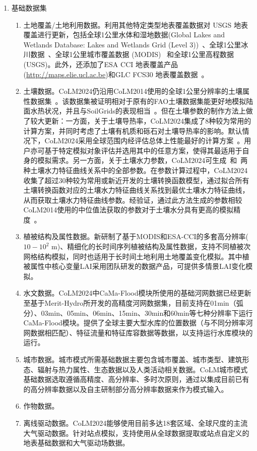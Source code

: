 \begin{enumerate}[label={\arabic*)}]
\item 基础数据集
  \begin{enumerate}[label={\alph*)}]
  \item 土地覆盖/土地利用数据。利用其他特定类型地表覆盖数据对 USGS 地表覆盖进行更新，包括全球1公里水体和湿地数据(Global Lakes and Wetlands Database: Lakes and Wetlands Grid (Level 3))~\citep{lehner2004development}、全球1公里冰川数据~\citep{RGIConsortium2017}、全球1公里城市覆盖数据 (MODIS)~\citep{schneider2009new} 和全球1公里高程数据(USGS)。此外，还添加了ESA CCI 地表覆盖产品(\url{http://maps.elie.ucl.ac.be})和GLC FCS30 地表覆盖数据~\citep{zhang2023glc_fcs30d}。
  \item 土壤数据。CoLM2024仍沿用CoLM2014使用的全球1公里分辨率的土壤属性数据集~\citep{shangguan2014global}。该数据集被证明相对于原有的FAO土壤数据集能更好地模拟陆面水热状况，并且与SoilGrids的表现相当~\citep{李文耀2020土壤}。但在土壤参数的制作方法上做了较大更新：一方面，关于土壤导热率，CoLM2024集成了8种较为常用的计算方案，并同时考虑了土壤有机质和砾石对土壤导热率的影响。默认情况下，CoLM2024采用全球范围内经评估总体上性能最好的计算方案~\citep{dai2019evaluation, balland2005}。用户亦可基于特定模拟对象评估并选用其中的任意方案，使得其最适用于自身的模拟需求。另一方面，关于土壤水力参数，CoLM2024可生成~\citet{campbell1974}和~\citet{van1980closed}两种土壤水力特征曲线关系中的全部参数。在参数计算过程中，CoLM2024收集了超过30种较为常用或新近开发的土壤转换函数模型，通过拟合所有土壤转换函数对应的土壤水力特征曲线关系找到最优土壤水力特征曲线，从而获取土壤水力特征曲线参数。经验证，通过此方法生成的参数相较CoLM2014使用的中位值法获取的参数对于土壤水分具有更高的模拟精度~\citep{dai2019parameters}。
  \item 植被结构及属性数据。新研制了基于MODIS和ESA-CCI的多套高分辨率($10-10^2$ m)、精细化的长时间序列植被结构及属性数据，支持不同植被次网格结构模拟，同时也适用于长时间土地利用土地覆盖变化模拟。其中植被属性中核心变量LAI采用团队研发的数据产品\citep{yuan2011reprocessing,lin2023ReprocessedMODISVersion}，可提供多情景LAI变化模拟。
  \item 水文数据。CoLM2024中CaMa-Flood模块所使用的基础河网数据已经更新至基于Merit-Hydro所开发的高精度河网数据集，目前支持在01min（弧分）、03min、05min、06min、15min、30min和60min等七种分辨率下运行CaMa-Flood模块。提供了全球主要大型水库的位置数据（与不同分辨率河网数据相匹配）、特征流量和特征库容数据等数据，以支持运行水库模块的运行。
  \item 城市数据。城市模式所需基础数据主要包含城市覆盖、城市类型、建筑形态、辐射与热力属性、生态数据以及人类活动相关数据。CoLM城市模式基础数据选取遵循高精度、高分辨率、多时次原则，通过以集成目前已有的高分辨率数据以及自主研制部分高分辨率数据来作为模式输入。
  \item 作物数据。
  \item 离线驱动数据。CoLM2024能够使用目前多达18套区域、全球尺度的主流大气驱动数据。针对站点模拟，支持使用从全球数据提取或站点自定义的地表基础数据和大气驱动场数据。
\end{enumerate}


\end{enumerate}
